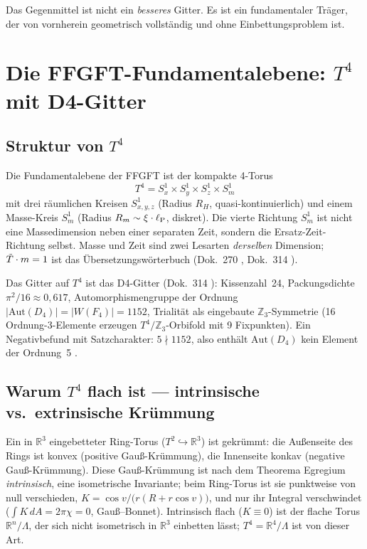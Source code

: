 Das Gegenmittel ist nicht ein \emph{besseres} Gitter.
Es ist ein fundamentaler Träger, der von vornherein
geometrisch vollständig und ohne Einbettungsproblem ist.

\section{Die FFGFT-Fundamentalebene: $T^4$ mit D4-Gitter}
\label{sec:t4}

\subsection{Struktur von $T^4$}

Die Fundamentalebene der FFGFT ist der kompakte 4-Torus
\[
  T^4 = S^1_x \times S^1_y \times S^1_z \times S^1_m
\]
mit drei räumlichen Kreisen $S^1_{x,y,z}$ (Radius $R_H$, quasi-kontinuierlich)
und einem Masse-Kreis $S^1_m$ (Radius $R_m \sim \xi\cdot\ell_{\mathrm{P}}$, diskret).
Die vierte Richtung $S^1_m$ ist nicht eine Massedimension neben einer
separaten Zeit, sondern die Ersatz-Zeit-Richtung selbst.
Masse und Zeit sind zwei Lesarten \emph{derselben} Dimension;
$\tilde{T}\cdot m = 1$ ist das Übersetzungswörterbuch (Dok.~270 \K,
Dok.~314 \K). \SETZ

Das Gitter auf $T^4$ ist das D4-Gitter (Dok.~314 \K):
Kissenzahl~24, Packungsdichte $\pi^2/16 \approx 0{,}617$,
Automorphismengruppe der Ordnung $|\text{Aut}(D_4)| = |W(F_4)| = 1152$,
Trialität als eingebaute $\mathbb{Z}_3$-Symmetrie (16 Ordnung-3-Elemente
erzeugen $T^4/\mathbb{Z}_3$-Orbifold mit 9 Fixpunkten).
Ein Negativbefund mit Satzcharakter: $5 \nmid 1152$, also enthält
$\text{Aut}(D_4)$ kein Element der Ordnung~5 \K.

\subsection{Warum $T^4$ flach ist — intrinsische vs.\ extrinsische Krümmung \K}
\label{sec:flach}

Ein in $\mathbb{R}^3$ eingebetteter Ring-Torus ($T^2 \hookrightarrow
\mathbb{R}^3$) ist gekrümmt: die Außenseite des Rings ist konvex
(positive Gauß-Krümmung), die Innenseite konkav (negative
Gauß-Krümmung). Diese Gauß-Krümmung ist nach dem Theorema Egregium
\emph{intrinsisch}, eine isometrische Invariante; beim Ring-Torus ist
sie punktweise von null verschieden, $K = \cos v/\bigl(r(R + r\cos v)\bigr)$,
und nur ihr Integral verschwindet ($\int K\,dA = 2\pi\chi = 0$,
Gauß--Bonnet). Intrinsisch flach ($K \equiv 0$) ist der flache Torus
$\mathbb{R}^n/\Lambda$, der sich nicht isometrisch in $\mathbb{R}^3$
einbetten lässt; $T^4 = \mathbb{R}^4/\Lambda$ ist von dieser Art.

